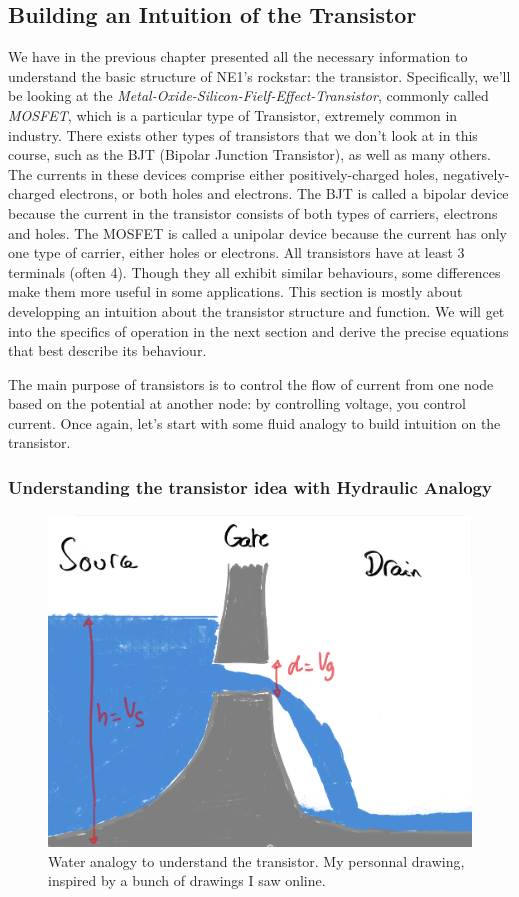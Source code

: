 \subsection{Building an Intuition of the Transistor}

We have in the previous chapter presented all the necessary information to understand the basic structure of NE1's rockstar: the transistor. Specifically, we'll be looking at the \textit{Metal-Oxide-Silicon-Fielf-Effect-Transistor}, commonly called \textit{MOSFET}, which is a particular type of Transistor, extremely common in industry. There exists other types of transistors that we don't look at in this course, such as the BJT (Bipolar Junction Transistor), as well as many others. The currents in these devices comprise either positively-charged holes, negatively-charged electrons, or both holes and electrons. The BJT is called a bipolar device because the current in the transistor consists of both types of carriers, electrons and holes. The MOSFET is called a unipolar device because the current has only one type of carrier, either holes or electrons.
All transistors have at least 3 terminals (often 4). Though they all exhibit similar behaviours, some differences make them more useful in some applications. This section is mostly about developping an intuition about the transistor structure and function. We will get into the specifics of operation in the next section and derive the precise equations that best describe its behaviour.  

The main purpose of transistors is to control the flow of current from one node based on the potential at another node: by controlling voltage, you control current. Once again, let's start with some fluid analogy to build intuition on the transistor. 

\subsubsection{Understanding the transistor idea with Hydraulic Analogy}

\begin{figure}[H]
    \centering
    \includegraphics[width=0.75\linewidth]{../../Figures/Transistor analogy.png}
    \caption{Water analogy to understand the transistor. My personnal drawing, inspired by a bunch of drawings I saw online.}
    \label{fig:Transistor analogy}
\end{figure}

